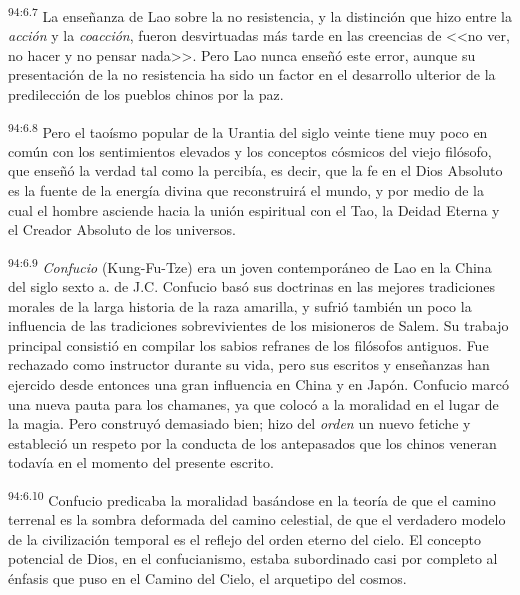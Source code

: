\par
\textsuperscript{94:6.7} La enseñanza de Lao sobre la no resistencia, y la distinción que hizo entre la \textit{acción} y la \textit{coacción}, fueron desvirtuadas más tarde en las creencias de <<no ver, no hacer y no pensar nada>>. Pero Lao nunca enseñó este error, aunque su presentación de la no resistencia ha sido un factor en el desarrollo ulterior de la predilección de los pueblos chinos por la paz.

\par
\textsuperscript{94:6.8} Pero el taoísmo popular de la Urantia del siglo veinte tiene muy poco en común con los sentimientos elevados y los conceptos cósmicos del viejo filósofo, que enseñó la verdad tal como la percibía, es decir, que la fe en el Dios Absoluto es la fuente de la energía divina que reconstruirá el mundo, y por medio de la cual el hombre asciende hacia la unión espiritual con el Tao, la Deidad Eterna y el Creador Absoluto de los universos.

\par
\textsuperscript{94:6.9} \textit{Confucio} (Kung-Fu-Tze) era un joven contemporáneo de Lao en la China del siglo sexto a. de J.C. Confucio basó sus doctrinas en las mejores tradiciones morales de la larga historia de la raza amarilla, y sufrió también un poco la influencia de las tradiciones sobrevivientes de los misioneros de Salem. Su trabajo principal consistió en compilar los sabios refranes de los filósofos antiguos. Fue rechazado como instructor durante su vida, pero sus escritos y enseñanzas han ejercido desde entonces una gran influencia en China y en Japón. Confucio marcó una nueva pauta para los chamanes, ya que colocó a la moralidad en el lugar de la magia. Pero construyó demasiado bien; hizo del \textit{orden} un nuevo fetiche y estableció un respeto por la conducta de los antepasados que los chinos veneran todavía en el momento del presente escrito.

\par
\textsuperscript{94:6.10} Confucio predicaba la moralidad basándose en la teoría de que el camino terrenal es la sombra deformada del camino celestial, de que el verdadero modelo de la civilización temporal es el reflejo del orden eterno del cielo. El concepto potencial de Dios, en el confucianismo, estaba subordinado casi por completo al énfasis que puso en el Camino del Cielo, el arquetipo del cosmos.

